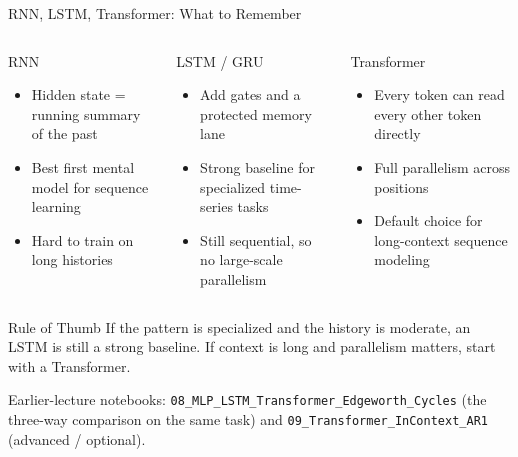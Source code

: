 \documentclass[aspectratio=169,11pt]{beamer}
\begin{document}
\begin{frame}{RNN, LSTM, Transformer: What to Remember}
\footnotesize
\begin{columns}[T]
\begin{block}{RNN}
\begin{itemize}\itemsep1pt
    \item Hidden state = running summary of the past
    \item Best first mental model for sequence learning
    \item Hard to train on long histories
\end{itemize}
\end{block}

\begin{block}{LSTM / GRU}
\begin{itemize}\itemsep1pt
    \item Add gates and a protected memory lane
    \item Strong baseline for specialized time-series tasks
    \item Still sequential, so no large-scale parallelism
\end{itemize}
\end{block}

\begin{block}{Transformer}
\begin{itemize}\itemsep1pt
    \item Every token can read every other token directly
    \item Full parallelism across positions
    \item Default choice for long-context sequence modeling
\end{itemize}
\end{block}
\end{columns}

\vspace{3pt}
\begin{exampleblock}{Rule of Thumb}
If the pattern is specialized and the history is moderate, an LSTM is still a strong baseline.  If context is long and parallelism matters, start with a Transformer.
\end{exampleblock}

\vspace{1pt}
{\scriptsize Earlier-lecture notebooks: \texttt{08\_MLP\_LSTM\_Transformer\_Edgeworth\_Cycles} (the three-way comparison on the same task) and \texttt{09\_Transformer\_InContext\_AR1} (advanced / optional).}
\end{frame}
\end{document}
